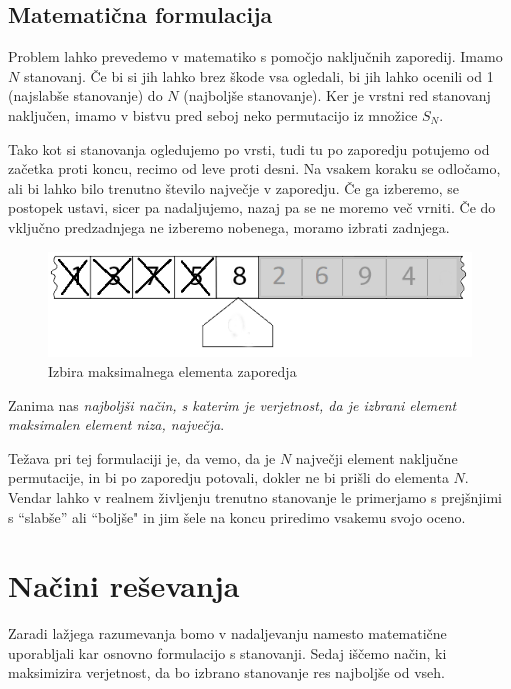 \documentclass[a4paper, 12pt, titlepage]{article}
\begin{document}
\subsection{Matematična formulacija}
Problem lahko prevedemo v matematiko s pomočjo naključnih zaporedij. Imamo $N$ stanovanj. Če bi si jih lahko brez škode vsa ogledali, bi jih lahko ocenili od 1 (najslabše stanovanje) do $N$ (najboljše stanovanje). Ker je vrstni red stanovanj naključen, imamo v bistvu pred seboj neko permutacijo iz množice $S_{N}$.

Tako kot si stanovanja ogledujemo po vrsti, tudi tu po zaporedju potujemo od začetka proti koncu, recimo od leve proti desni. Na vsakem koraku se odločamo, ali bi lahko bilo trenutno število največje v zaporedju. Če ga izberemo, se postopek ustavi, sicer pa nadaljujemo, nazaj pa se ne moremo več vrniti. Če do vključno predzadnjega ne izberemo nobenega, moramo izbrati zadnjega.

\begin{figure}
    \centering
    \includegraphics{slike/mat_formulacija.png}
    \caption{Izbira maksimalnega elementa zaporedja}
\end{figure}

Zanima nas \emph{najboljši način, s katerim je verjetnost, da je izbrani element maksimalen element niza, največja}.

Težava pri tej formulaciji je, da vemo, da je $N$ največji element naključne permutacije, in bi po zaporedju potovali, dokler ne bi prišli do elementa $N$. Vendar lahko v realnem življenju trenutno stanovanje le primerjamo s prejšnjimi s ``slabše'' ali ``boljše" in jim šele na koncu priredimo vsakemu svojo oceno.

\section{Načini reševanja}

Zaradi lažjega razumevanja bomo v nadaljevanju namesto matematične uporabljali kar osnovno formulacijo s stanovanji. Sedaj iščemo način, ki maksimizira verjetnost, da bo izbrano stanovanje res najboljše od vseh.
\end{document}
